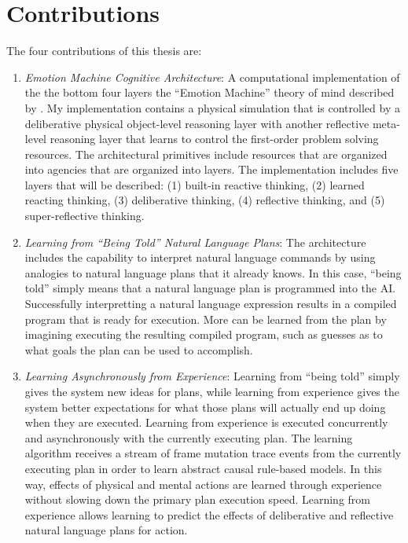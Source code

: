 \section{Contributions}

The four contributions of this thesis are:
\begin{enumerate}
\item \emph{Emotion Machine Cognitive Architecture}: A computational
  implementation of the the bottom four layers the ``Emotion Machine''
  theory of mind described by \cite[]{minsky:2006}.  My implementation
  contains a physical simulation that is controlled by a deliberative
  physical object-level reasoning layer with another reflective
  meta-level reasoning layer that learns to control the first-order
  problem solving resources.  The architectural primitives include
  resources that are organized into agencies that are organized into
  layers.  The implementation includes five layers that will be
  described: (1) built-in reactive thinking, (2) learned reacting
  thinking, (3) deliberative thinking, (4) reflective thinking, and
  (5) super-reflective thinking.
\item \emph{Learning from ``Being Told'' Natural Language Plans}: The
  architecture includes the capability to interpret natural language
  commands by using analogies to natural language plans that it
  already knows.  In this case, ``being told'' simply means that a
  natural language plan is programmed into the AI.  Successfully
  interpretting a natural language expression results in a compiled
  program that is ready for execution.  More can be learned from the
  plan by imagining executing the resulting compiled program, such as
  guesses as to what goals the plan can be used to accomplish.
\item \emph{Learning Asynchronously from Experience}: Learning from
  ``being told'' simply gives the system new ideas for plans, while
  learning from experience gives the system better expectations for
  what those plans will actually end up doing when they are executed.
  Learning from experience is executed concurrently and asynchronously
  with the currently executing plan.  The learning algorithm receives
  a stream of frame mutation trace events from the currently executing
  plan in order to learn abstract causal rule-based models.  In this
  way, effects of physical and mental actions are learned through
  experience without slowing down the primary plan execution speed.
  Learning from experience allows learning to predict the effects of
  deliberative and reflective natural language plans for action.

\end{enumerate}
